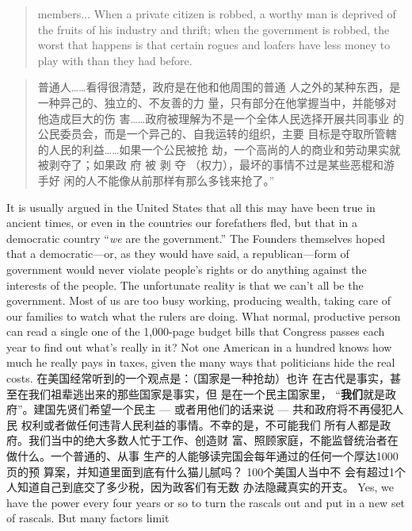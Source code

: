 \begin{paracol}{2}
\begin{quote}
members$\ldots$ When a private citizen is robbed, a worthy man is
deprived of the fruits of his industry and thrift; when the government is robbed, the worst that happens is that certain rogues and
loafers have less money to play with than they had before.
\end{quote}
\switchcolumn
\begin{quote}
普通人……看得很清楚，政府是在他和他周围的普通
人之外的某种东西，是一种异己的、独立的、不友善的力
量，只有部分在他掌握当中，并能够对他造成巨大的伤
害……政府被理解为不是一个全体人民选择开展共同事业
的公民委员会，而是一个异己的、自我运转的组织，主要
目标是夺取所管轄的人民的利益……如果一个公民被抢
劫，一个高尚的人的商业和劳动果实就被剥夺了；如果政
府 被 剥 夺 （权力），最坏的事情不过是某些恶棍和游手好
闲的人不能像从前那样有那么多钱来抢了。”
\end{quote}
It is usually argued in the United States that all this may have
been true in ancient times, or even in the countries our forefathers fled, but that in a democratic country ``\textit{we} are the government.'' The Founders themselves hoped that a democratic---or,
as they would have said, a republican---form of government
would never violate people's rights or do anything against the
interests of the people. The unfortunate reality is that we can't
all be the government. Most of us are too busy working, producing wealth, taking care of our families to watch what the
rulers are doing. What normal, productive person can read a
single one of the 1,000-page budget bills that Congress passes
each year to find out what's really in it? Not one American in a
hundred knows how much he really pays in taxes, given the
many ways that politicians hide the real costs.
\switchcolumn
在美国经常听到的一个观点是：（国家是一种抢劫）也许
在古代是事实，甚至在我们祖辈逃出来的那些国家是事实，但
是在一个民主国家里， “\textbf{我们}就是政府”。建国先贤们希望一个民主 --- 或者用他们的话来说 --- 共和政府将不再侵犯人民
权利或者做任何违背人民利益的事情。不幸的是，不可能我们
所有人都是政府。我们当中的绝大多数人忙于工作、创造财
富、照顾家庭，不能监督统治者在做什么。一个普通的、从事
生产的人能够读完国会每年通过的任何一个厚达1000页的预
算案，并知道里面到底有什么猫儿腻吗？ 100个美国人当中不
会有超过1个人知道自己到底交了多少税，因为政客们有无数
办法隐藏真实的开支。
\switchcolumn*
Yes, we have the power every four years or so to turn the rascals out and put in a new set of rascals. But many factors limit

\end{paracol}
